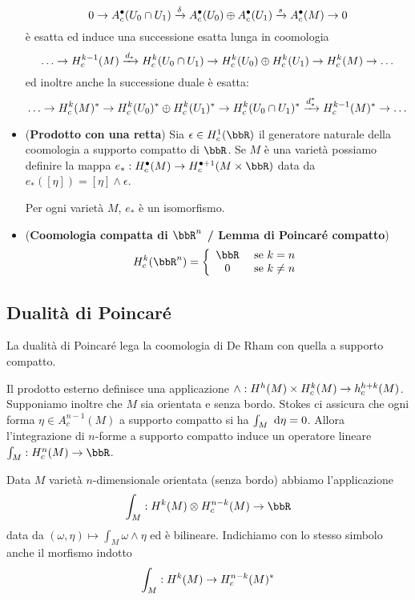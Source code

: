 \documentclass[a4paper,NoNotes,GeneralMath]{stdmdoc}
\newcommand{\xrar}[1]{\ensuremath{\xrightarrow{#1}}}
\begin{document}
\begin{itemize}
  $$ 0 \rar A^\bullet_c (U_0 \cap U_1) \xrar{\delta} A^\bullet_c(U_0) \oplus A^\bullet_c(U_1) \xrar{s} A^\bullet_c(M) \rar 0 $$
  è esatta ed induce una successione esatta lunga in coomologia
  $$ \ldots \rar H^{k-1}_c(M) \xrar{d_*} H^k_c(U_0 \cap U_1) \rar H^k_c(U_0) \oplus H^k_c(U_1) \rar H^k_c(M) \rar \ldots $$
  ed inoltre anche la successione duale è esatta:
  $$ \ldots \rar H^k_c(M)^* \rar H^k_c(U_0)^* \oplus H^k_c(U_1)^* \rar H^k_c(U_0 \cap U_1)^* \xrar{d_*^*} H^{k-1}_c(M)^* \rar \ldots $$
\item ({\bf Prodotto con una retta}) Sia $\epsilon \in H^1_c(\bbR)$ il generatore naturale della coomologia a supporto compatto di $\bbR$. Se $M$ è una varietà possiamo definire la mappa $e_* : H^\bullet_c(M) \rar H^{\bullet + 1}_c(M \times \bbR)$ data da $e_*([\eta]) = [\eta] \wedge \epsilon$.

  Per ogni varietà $M$, $e_*$ è un isomorfismo.
\item ({\bf Coomologia compatta di $\bbR^n$ / Lemma di Poincaré compatto})
  \begin{displaymath}
    H^k_c(\bbR^n) =
    \left\{
      \begin{array}{cl}
        \bbR & \text{ se } k = n    \\
        0    & \text{ se } k \neq n \\
      \end{array}
    \right.
  \end{displaymath}
\end{itemize}

\subsection{Dualità di Poincaré}
La dualità di Poincaré lega la coomologia di De Rham con quella a supporto compatto.

Il prodotto esterno definisce una applicazione $\wedge: H^h(M) \times H^k_c(M) \rightarrow h^{h+k}_c(M)$. Supponiamo inoltre che $M$ sia orientata e senza bordo. Stokes ci assicura che ogni forma $\eta \in A^{n-1}_c(M)$ a supporto compatto si ha $\int_M \de\eta = 0$. Allora l'integrazione di $n$-forme a supporto compatto induce un operatore lineare $\int_M : H^n_c(M) \rar \bbR$.

Data $M$ varietà $n$-dimensionale orientata (senza bordo) abbiamo l'applicazione
$$ \int_M : H^k(M) \otimes H^{n-k}_c(M) \rar \bbR $$
data da $(\omega, \eta) \mapsto \int_M \omega \wedge \eta$ ed è bilineare.
Indichiamo con lo stesso simbolo anche il morfismo indotto
$$ \int_M : H^k(M) \rightarrow H^{n-k}_c(M)^* $$
\end{document}

